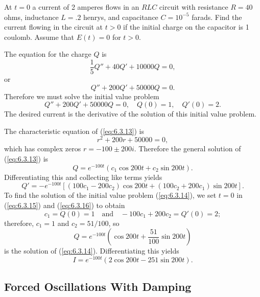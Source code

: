 \documentclass{ximera}
\begin{document}
\begin{example}\label{example:6.3.1}
At $t=0$ a current of 2 amperes flows in an $RLC$ circuit with
resistance $R=40$ ohms, inductance $L=.2$ henrys, and capacitance
$C=10^{-5}$ farads. Find the current flowing in the circuit at $t>0$
if the initial charge on the capacitor is 1 coulomb. Assume that
$E(t)=0$ for $t>0$.

\begin{explanation} The equation for the charge $Q$ is $$\frac{1}{5}Q''+40Q'+10000Q=0, $$ or
\begin{equation} \label{eq:6.3.13}
Q''+200Q'+50000Q=0.
\end{equation}
Therefore we must solve the initial value problem
\begin{equation} \label{eq:6.3.14}
Q''+200Q'+50000Q=0,\quad Q(0)=1,\quad Q'(0)=2.
\end{equation}
The desired current is the derivative of the solution of this initial
value problem.

The characteristic equation of (\ref{eq:6.3.13}) is
$$
r^2+200r+50000=0,
$$
which has complex zeros $r=-100\pm200i$. Therefore the general
solution of (\ref{eq:6.3.13}) is
\begin{equation} \label{eq:6.3.15}
Q=e^{-100t}(c_1\cos200t+c_2\sin200t).
\end{equation}
Differentiating this and collecting like terms yields
\begin{equation} \label{eq:6.3.16}
Q'=-e^{-100t}\left[(100c_1-200c_2)\cos200t+
(100c_2+200c_1)\sin200t\right].
\end{equation}
To find the solution of the initial value problem (\ref{eq:6.3.14}),
we set $t=0$ in (\ref{eq:6.3.15}) and (\ref{eq:6.3.16}) to obtain
$$
c_1=Q(0)=1\quad\mbox{and}\quad   -100c_1+200c_2=Q'(0)=2;
$$
therefore, $c_1=1$ and $c_2=51/100$, so
$$
Q=e^{-100t}\left(\cos200t+\frac{51}{100}\sin200t\right)
$$
is the solution of (\ref{eq:6.3.14}).
Differentiating this yields
$$
I=e^{-100t}(2\cos200t-251\sin200t).
$$
\end{explanation}
\end{example}

\subsection*{Forced Oscillations With Damping}
\end{document}
